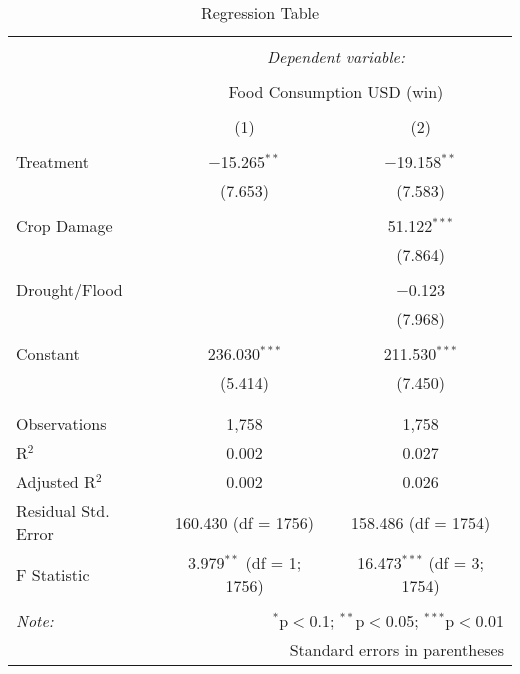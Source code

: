 
\begin{table}[!htbp] \centering 
  \caption{Regression Table} 
  \label{} 
\begin{tabular}{@{\extracolsep{5pt}}lcc} 
\\[-1.8ex]\hline 
\hline \\[-1.8ex] 
 & \multicolumn{2}{c}{\textit{Dependent variable:}} \\ 
\cline{2-3} 
\\[-1.8ex] & \multicolumn{2}{c}{Food Consumption USD (win)} \\ 
\\[-1.8ex] & (1) & (2)\\ 
\hline \\[-1.8ex] 
 Treatment & $-$15.265$^{**}$ & $-$19.158$^{**}$ \\ 
  & (7.653) & (7.583) \\ 
  & & \\ 
 Crop Damage &  & 51.122$^{***}$ \\ 
  &  & (7.864) \\ 
  & & \\ 
 Drought/Flood &  & $-$0.123 \\ 
  &  & (7.968) \\ 
  & & \\ 
 Constant & 236.030$^{***}$ & 211.530$^{***}$ \\ 
  & (5.414) & (7.450) \\ 
  & & \\ 
\hline \\[-1.8ex] 
Observations & 1,758 & 1,758 \\ 
R$^{2}$ & 0.002 & 0.027 \\ 
Adjusted R$^{2}$ & 0.002 & 0.026 \\ 
Residual Std. Error & 160.430 (df = 1756) & 158.486 (df = 1754) \\ 
F Statistic & 3.979$^{**}$ (df = 1; 1756) & 16.473$^{***}$ (df = 3; 1754) \\ 
\hline 
\hline \\[-1.8ex] 
\textit{Note:}  & \multicolumn{2}{r}{$^{*}$p$<$0.1; $^{**}$p$<$0.05; $^{***}$p$<$0.01} \\ 
 & \multicolumn{2}{r}{Standard errors in parentheses} \\ 
\end{tabular} 
\end{table} 
